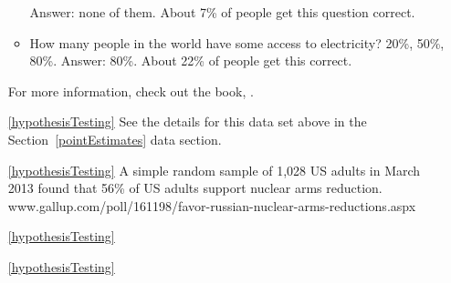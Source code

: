 \begin{itemize}
\begin{itemize}
        Answer: none of them.
        About 7\% of people get this question correct.
    \item
        How many people in the world have some access
        to electricity? 20\%, 50\%, 80\%.
        Answer: 80\%.
        About 22\% of people get this correct.
    \end{itemize}
    For more information, check out the book,
    .
\item[\ref{hypothesisTesting}]
    See the details for this data set above
    in the Section~\ref{pointEstimates} data section.
\item[\ref{hypothesisTesting}]
    A simple random sample of 1,028 US adults in March 2013
    found that 56\% of US adults support nuclear arms
    reduction. \\
        {www.gallup.com/poll/161198/favor-russian-nuclear-arms-reductions.aspx}
\item[\ref{hypothesisTesting}]
    \madeup{}
\item[\ref{hypothesisTesting}]

\end{itemize}





\D{\newpage}

\section{}
\label{ch_inference_for_props_data}

